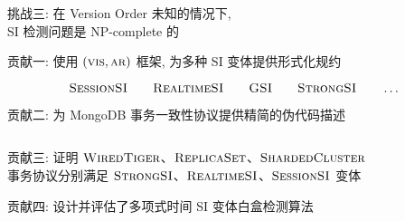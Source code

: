 \begin{frame}{}
  \begin{center}
	  挑战三: 在 Version Order 未知的情况下, \\[5pt]
    SI 检测问题是 \textsf{NP-complete} 的

	  \vspace{0.60cm}
  \end{center}
\end{frame}

\begin{frame}{}
  \begin{center}
    贡献一: 使用 $(\textsc{vis}, \textsc{ar})$ 框架, 为多种 SI 变体提供形式化规约

    \vspace{0.30cm}
    \vspace{-0.50cm}

    \[
      \textsc{SessionSI} \qquad \textsc{RealtimeSI} \qquad \textsc{GSI} \qquad \textsc{StrongSI} \qquad \dots
    \]
  \end{center}
\end{frame}

\begin{frame}{}
  \begin{center}
	贡献二: 为 MongoDB 事务一致性协议提供精简的伪代码描述
  \end{center}

  \vspace{0.50cm}
  \begin{columns}
  \end{columns}
\end{frame}

\begin{frame}{}
  \begin{center}
    贡献三: 证明 $\textsc{WiredTiger}$、$\textsc{ReplicaSet}$、$\textsc{ShardedCluster}$ \\[5pt]
    事务协议分别满足 $\textsc{StrongSI}$、$\textsc{RealtimeSI}$、$\textsc{SessionSI}$ 变体
  \end{center}

\end{frame}

\begin{frame}{}
  \begin{center}
	贡献四: 设计并评估了多项式时间 SI 变体白盒检测算法
  \end{center}

\end{frame}
